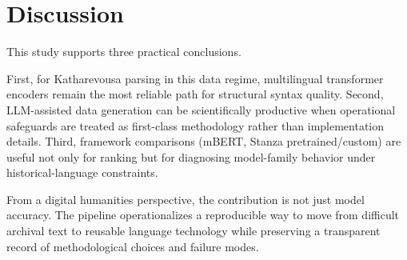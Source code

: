 \section{Discussion}

This study supports three practical conclusions.

First, for Katharevousa parsing in this data regime, multilingual transformer encoders remain the most reliable path for structural syntax quality. Second, LLM-assisted data generation can be scientifically productive when operational safeguards are treated as first-class methodology rather than implementation details. Third, framework comparisons (mBERT, Stanza pretrained/custom) are useful not only for ranking but for diagnosing model-family behavior under historical-language constraints.

From a digital humanities perspective, the contribution is not just model accuracy. The pipeline operationalizes a reproducible way to move from difficult archival text to reusable language technology while preserving a transparent record of methodological choices and failure modes.
